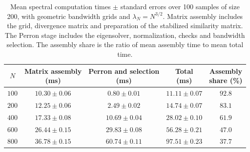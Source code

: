 \begin{table}[htbp]
    \centering
    \small
    \begin{tabular}{ccccc}
        \toprule
        $N$ & \shortstack{Matrix assembly\\(ms)} & \shortstack{Perron and selection\\(ms)} & \shortstack{Total\\(ms)} & \shortstack{Assembly\\share (\%)} \\
        \midrule
        $100$ & $10.30 \pm 0.06$ & $0.80 \pm 0.01$ & $11.11 \pm 0.07$ & $92.8$ \\
        $200$ & $12.25 \pm 0.06$ & $2.49 \pm 0.02$ & $14.74 \pm 0.07$ & $83.1$ \\
        $400$ & $17.33 \pm 0.08$ & $10.69 \pm 0.04$ & $28.02 \pm 0.10$ & $61.9$ \\
        $600$ & $26.44 \pm 0.15$ & $29.83 \pm 0.08$ & $56.28 \pm 0.21$ & $47.0$ \\
        $800$ & $36.78 \pm 0.15$ & $60.74 \pm 0.11$ & $97.51 \pm 0.23$ & $37.7$ \\
        \bottomrule
    \end{tabular}
    \caption{Mean spectral computation times $\pm$ standard errors over 100 samples of size 200, with geometric bandwidth grids and $\lambda_N=N^{3/2}$. Matrix assembly includes the grid, divergence matrix and preparation of the stabilized similarity matrix. The Perron stage includes the eigensolver, normalization, checks and bandwidth selection. The assembly share is the ratio of mean assembly time to mean total time.}
\end{table}

